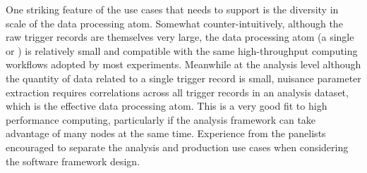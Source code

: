 \documentclass[../main-v1.tex]{subfiles}
\begin{document}
One striking feature of the use cases that  needs to support is the diversity in scale of the data processing atom.  Somewhat counter-intuitively, although the raw trigger records are themselves very large, the data processing atom (a single  or ) is relatively small and compatible with the same high-throughput computing workflows adopted by most  experiments.  Meanwhile at the analysis level although the quantity of data related to a single trigger record is small, nuisance parameter extraction requires correlations across all trigger records in an analysis dataset, which is the effective data processing atom.  This is a very good fit to high performance computing, particularly if the analysis framework can take advantage of many  nodes at the same time. Experience from the  panelists encouraged  to separate the analysis and production use cases when considering the software framework design.






\end{document}

